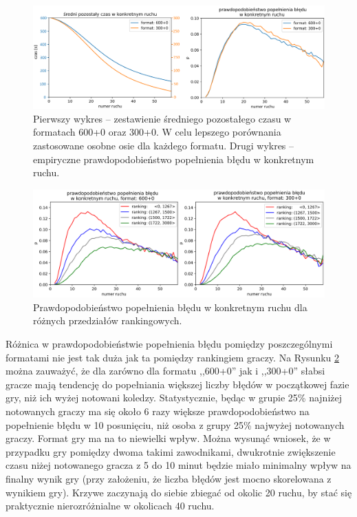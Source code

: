 \documentclass[inzynierska]{pwr_wmat_praca_dyplomowa}
\theoremstyle{plain}
\numberwithin{theorem}{chapter}
\theoremstyle{definition}
\numberwithin{theorem}{chapter}
\begin{document}
\begin{figure}[h]
	\centering
	\includegraphics[width=\textwidth]{pozostaly_czas.png}
	\caption{
		Pierwszy wykres -- zestawienie średniego pozostałego czasu w formatach 600+0 oraz 300+0. W celu lepszego porównania zastosowane osobne osie dla każdego formatu. Drugi wykres -- empiryczne prawdopodobieństwo popełnienia błędu w konkretnym ruchu.}
	\label{rys:pozostaly_czas}
\end{figure}
\begin{figure}[h]
	\centering
	\includegraphics[width=\textwidth]{prawd_blad_ELO.png}
	\caption{Prawdopodobieństwo popełnienia błędu w konkretnym ruchu dla różnych przedziałów rankingowych.}
	\label{rys:prawd_blad_ELO}
\end{figure}
Różnica w prawdopodobieństwie popełnienia błędu pomiędzy poszczególnymi formatami nie jest tak duża jak ta pomiędzy rankingiem graczy. Na Rysunku \ref{rys:prawd_blad_ELO} można zauważyć, że dla zarówno dla formatu ,,600+0'' jak i ,,300+0'' słabsi gracze mają tendencję do popełniania większej liczby błędów w początkowej fazie gry, niż ich wyżej notowani koledzy. Statystycznie, będąc w grupie 25\% najniżej notowanych graczy ma się około 6 razy większe prawdopodobieństwo na popełnienie błędu w 10 posunięciu, niż osoba z grupy 25\% najwyżej notowanych graczy. Format gry ma na to niewielki wpływ. Można wysunąć wniosek, że w przypadku gry pomiędzy dwoma takimi zawodnikami, dwukrotnie zwiększenie czasu niżej notowanego gracza z 5 do 10 minut będzie miało minimalny wpływ na finalny wynik gry (przy założeniu, że liczba błędów jest mocno skorelowana z wynikiem gry). Krzywe zaczynają do siebie zbiegać od okolic 20 ruchu, by stać się praktycznie nierozróżnialne w okolicach 40 ruchu.
\end{document}
